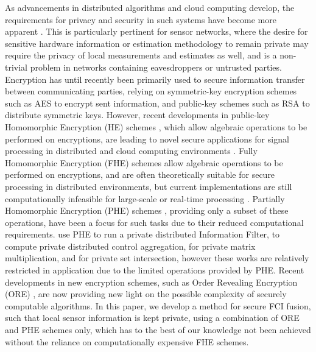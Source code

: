 \documentclass[letterpaper, 10 pt, conference]{ieeeconf}  %
\begin{document}
As advancements in distributed algorithms and cloud computing develop, the requirements for privacy and security in such systems have become more apparent \cite{renSecurityChallengesPublic2012,brennerSecretProgramExecution2011}. This is particularly pertinent for sensor networks, where the desire for sensitive hardware information or estimation methodology to remain private may require the privacy of local measurements and estimates as well, and is a non-trivial problem in networks containing eavesdroppers or untrusted parties. Encryption has until recently been primarily used to secure information transfer between communicating parties, relying on symmetric-key encryption schemes such as AES \cite{gueronIntelAdvancedEncryption2010} to encrypt sent information, and public-key schemes such as RSA \cite{rivestMethodObtainingDigital1978} to distribute symmetric keys. However, recent developments in public-key Homomorphic Encryption (HE) schemes \cite{gentryFullyHomomorphicEncryption2009,stehleFasterFullyHomomorphic2010,elgamalPublicKeyCryptosystem1985,paillierPublicKeyCryptosystemsBased1999}, which allow algebraic operations to be performed on encryptions, are leading to novel secure applications for signal processing in distributed and cloud computing environments \cite{lagendijkEncryptedSignalProcessing2012,aristovEncryptedMultisensorInformation2018,farokhiSecurePrivateControl2017,alexandruEncryptedCooperativeControl2019,kogisoCyberSecurityEnhancementNetworked2015,kerschbaumOutsourcedPrivateSet2012}. Fully Homomorphic Encryption (FHE) schemes \cite{gentryFullyHomomorphicEncryption2009,stehleFasterFullyHomomorphic2010} allow algebraic operations to be performed on encryptions, and are often theoretically suitable for secure processing in distributed environments, but current implementations are still computationally infeasible for large-scale or real-time processing \cite{acarSurveyHomomorphicEncryption2018}. Partially Homomorphic Encryption (PHE) schemes \cite{elgamalPublicKeyCryptosystem1985,paillierPublicKeyCryptosystemsBased1999}, providing only a subset of these operations, have been a focus for such tasks due to their reduced computational requirements. \cite{aristovEncryptedMultisensorInformation2018} use PHE to run a private distributed Information Filter, \cite{alexandruEncryptedCooperativeControl2019,farokhiSecurePrivateControl2017} to compute private distributed control aggregation, \cite{kogisoCyberSecurityEnhancementNetworked2015} for private matrix multiplication, and \cite{kerschbaumOutsourcedPrivateSet2012} for private set intersection, however these works are relatively restricted in application due to the limited operations provided by PHE. Recent developments in new encryption schemes, such as Order Revealing Encryption (ORE) \cite{chenettePracticalOrderRevealingEncryption2016,lewiOrderRevealingEncryptionNew2016,bogatovComparativeEvaluationOrderPreserving2018}, are now providing new light on the possible complexity of securely computable algorithms. In this paper, we develop a method for secure FCI fusion, such that local sensor information is kept private, using a combination of ORE and PHE schemes only, which has to the best of our knowledge not been achieved without the reliance on computationally expensive FHE schemes.
\end{document}
